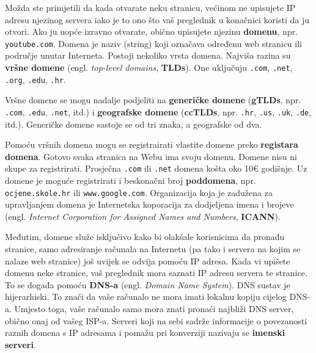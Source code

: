 Možda ste primjetili da kada otvarate neku stranicu, većinom ne upisujete IP adresu njezinog servera iako je to ono što vaš preglednik u konačnici koristi da ju otvori.
Ako ju uopće izravno otvarate, obično upisujete njezinu \textbf{domenu}, npr. \verb|youtube.com|.
Domena je naziv (string) koji označava određenu web stranicu ili područje unutar Interneta.
Postoji nekoliko vrsta domena.
Najviša razina su \textbf{vršne domene} (engl. \textit{top-level domains}, \textbf{TLDs}).
One uključuju \verb|.com|, \verb|.net|, \verb|.org|, \verb|.edu|, \verb|.hr|.

Vršne domene se mogu nadalje podjeliti na \textbf{generičke domene} (\textbf{gTLDs}, npr. \verb|.com|, \verb|.edu|, \verb|.net|, itd.) i \textbf{geografske domene} (\textbf{ccTLDs}, npr. \verb|.hr|, \verb|.us|, \verb|.uk|, \verb|.de|, itd.).
Generičke domene sastoje se od tri znaka, a geografske od dva.

Pomoću vršnih domena mogu se registrairati vlastite domene preko \textbf{registara domena}.
Gotovo svaka stranica na Webu ima svoju domenu.
Domene nisu ni skupe za registrirati.
Prosječna \verb|.com| ili \verb|.net| domena košta oko 10€ godišnje.
Uz domene je moguće registrirati i beskonačni broj \textbf{poddomena}, npr. \verb|ocjene.skole.hr| ili \verb|www.google.com|.
Organizacija koja je zadužena za upravljanjem domena je Internetska koporacija za dodjeljena imena i brojeve (engl. \textit{Internet Corporation for Assigned Names and Numbers}, \textbf{ICANN}).


Međutim, domene služe isključivo kako bi olakšale korisnicima da pronađu stranice, samo adresiranje računala na Internetu (pa tako i servera na kojim se nalaze web stranice) još uvijek se odvija pomoću IP adresa.
Kada vi upišete domenu neke stranice, vaš preglednik mora saznati IP adresu servera te stranice.
To se događa pomoću \textbf{DNS-a} (engl. \textit{Domain Name System}).
DNS sustav je hijerarhiski.
To znači da vaše računalo ne mora imati lokalnu kopiju cijelog DNS-a.
Umjesto toga, vaše računalo samo mora znati pronaći najbliži DNS server, obično onaj od vašeg ISP-a.
Serveri koji na sebi sadrže informacije o povezanosti raznih domena s IP adresama i pomažu pri konverziji nazivaju se \textbf{imenski serveri}.

